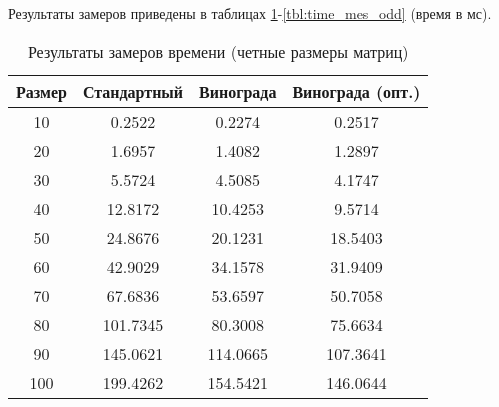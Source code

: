 Результаты замеров приведены в таблицах \ref{tbl:time_mes_even}-\ref{tbl:time_mes_odd} (время в мс).

\begin{table}[h]
    \begin{center}
        \begin{threeparttable}
        \captionsetup{justification=raggedright,singlelinecheck=off}
        \caption{Результаты замеров времени (четные размеры матриц)}
        \label{tbl:time_mes_even}
        \begin{tabular}{|c|c|c|c|}
            \hline
            Размер & Стандартный & Винограда & Винограда (опт.) \\
            \hline
            10 & 0.2522 & 0.2274 & 0.2517 \\
            \hline
            20 & 1.6957 & 1.4082 & 1.2897 \\
            \hline
            30 & 5.5724 & 4.5085 & 4.1747 \\
            \hline
            40 & 12.8172 & 10.4253 & 9.5714 \\
            \hline
            50 & 24.8676 & 20.1231 & 18.5403 \\
            \hline
            60 & 42.9029 & 34.1578 & 31.9409 \\
            \hline
            70 & 67.6836 & 53.6597 & 50.7058 \\
            \hline
            80 & 101.7345 & 80.3008 & 75.6634 \\
            \hline
            90 & 145.0621 & 114.0665 & 107.3641 \\
            \hline
            100 & 199.4262 & 154.5421 & 146.0644 \\
            \hline
		\end{tabular}
    \end{threeparttable}
\end{center}
\end{table}

\clearpage


